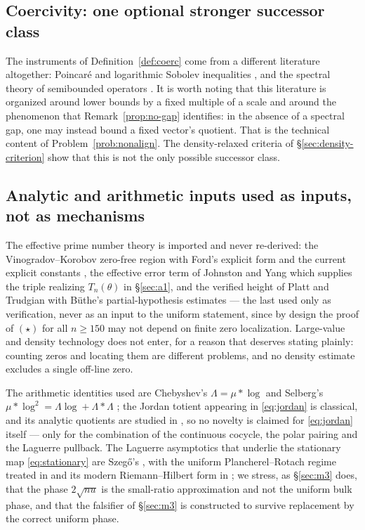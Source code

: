 \documentclass[11pt]{amsart}
\theoremstyle{definition}
\theoremstyle{remark}
\theoremstyle{definition}
\begin{document}
\subsection{Coercivity: one optional stronger successor class}

The instruments of Definition~\ref{def:coerc} come from a different literature altogether:
Poincar\'e and logarithmic Sobolev inequalities \cite{Gross,BGL}, and the spectral theory of
semibounded operators \cite{ReedSimon,Davies}. It is worth noting that this literature is organized
around lower bounds by a fixed multiple of a scale and around the phenomenon that
Remark~\ref{prop:no-gap} identifies: in the absence of a spectral gap, one may instead bound
a fixed vector's quotient. That is the technical content of Problem~\ref{prob:nonalign}.  The
density-relaxed criteria of \S\ref{sec:density-criterion} show that this is not the only possible
successor class.

\subsection{Analytic and arithmetic inputs used as inputs, not as mechanisms}

The effective prime number theory is imported and never re-derived: the Vinogradov--Korobov
zero-free region \cite{Vinogradov,Korobov} with Ford's explicit form \cite{Ford} and the current
explicit constants \cite{MTY}, the effective error term of Johnston and Yang
\cite{JohnstonYang} which supplies the triple realizing $T_n(\theta)$ in
\S\ref{sec:a1}, and the verified height of Platt and Trudgian \cite{PlattTrudgian} with
B\"uthe's partial-hypothesis estimates \cite{Buthe} --- the last used only as verification, never as
an input to the uniform statement, since by design the proof of $(\star)$ for all $n\ge150$ may
not depend on finite zero localization. Large-value and density technology
\cite{GuthMaynard,Montgomery} does not enter, for a reason that deserves stating plainly: counting
zeros and locating them are different problems, and no density estimate excludes a single off-line
zero.

The arithmetic identities used are Chebyshev's $\Lambda=\mu*\log$ and Selberg's
$\mu*\log^2=\Lambda\log+\Lambda*\Lambda$ \cite{Selberg1949,Erdos1949,Apostol}; the Jordan totient
appearing in \eqref{eq:jordan} is classical, and its analytic quotients are studied in
\cite{MSSS}, so no novelty is claimed for \eqref{eq:jordan} itself --- only for the combination of
the continuous cocycle, the polar pairing and the Laguerre pullback. The Laguerre asymptotics that
underlie the stationary map \eqref{eq:stationary} are Szeg\H{o}'s \cite{Szego}, with the uniform
Plancherel--Rotach regime treated in \cite{Erdelyi,Olver} and its modern Riemann--Hilbert form in
\cite{DKMVZ}; we stress, as \S\ref{sec:m3} does, that the phase $2\sqrt{nu}$ is the small-ratio
approximation and not the uniform bulk phase, and that the falsifier of \S\ref{sec:m3} is
constructed to survive replacement by the correct uniform phase.
\end{document}
